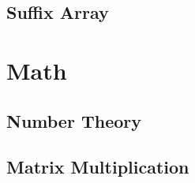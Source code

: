 \documentclass[10pt]{article}
\begin{document}
\subsection{Suffix Array}


\section{Math}
\subsection{Number Theory}








\subsection{Matrix Multiplication}

\end{document}
